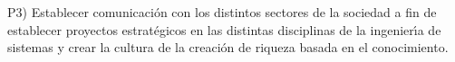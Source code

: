 P3) Establecer comunicaci\'{o}n con los distintos sectores de la
sociedad a fin de establecer proyectos estrat\'{e}gicos en las
distintas disciplinas de la ingenier\'{\i}a de sistemas y crear la
cultura de la creaci\'{o}n de riqueza basada en el conocimiento.
